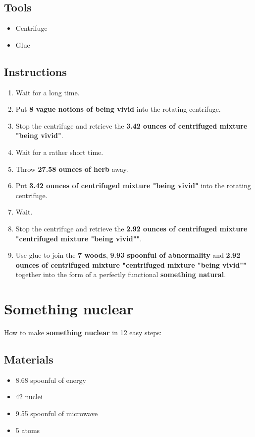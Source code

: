 \documentclass{article}
\begin{document}
\subsection{Tools}\begin{itemize}
\item 
Centrifuge
\item 
Glue
\end{itemize}
\subsection{Instructions}\begin{enumerate}
\item 
Wait for a long time.
\item 
Put \textbf{8 vague notions of being vivid} into the rotating centrifuge.
\item 
Stop the centrifuge and retrieve the \textbf{3.42 ounces of centrifuged mixture "being vivid"}.
\item 
Wait for a rather short time.
\item 
Throw \textbf{27.58 ounces of herb} away.
\item 
Put \textbf{3.42 ounces of centrifuged mixture "being vivid"} into the rotating centrifuge.
\item 
Wait.
\item 
Stop the centrifuge and retrieve the \textbf{2.92 ounces of centrifuged mixture "centrifuged mixture "being vivid""}.
\item 
Use glue to join the \textbf{7 woods}, \textbf{9.93 spoonful of abnormality} and \textbf{2.92 ounces of centrifuged mixture "centrifuged mixture "being vivid""} together into the form of a perfectly functional \textbf{something natural}.
\end{enumerate}
\newpage
\section{Something nuclear}How to make \textbf{something nuclear} in 12 easy steps:

\subsection{Materials}\begin{itemize}
\item 
8.68 spoonful of energy
\item 
42 nuclei
\item 
9.55 spoonful of microwave
\item 
5 atoms
\end{itemize}
\end{document}
